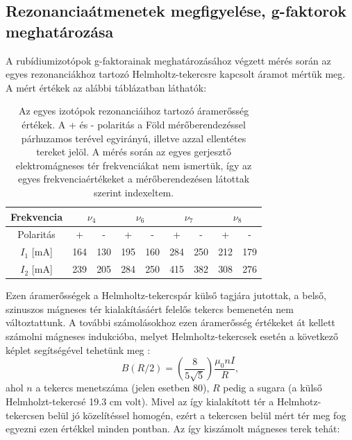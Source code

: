 \documentclass[12pt,a4paper]{article}
\begin{document}
\subsection{Rezonanciaátmenetek megfigyelése, g-faktorok meghatározása}
\hspace*{10pt} A rubídiumizotópok g-faktorainak meghatározásához végzett mérés során az egyes rezonanciákhoz tartozó Helmholtz-tekercsre kapcsolt áramot mértük meg. A mért értékek az alábbi táblázatban láthatók:
\begin{table}[!h]
\begin{center}
\begin{tabular}{|c||c|c||c|c||c|c||c|c|}
\hline
Frekvencia & \multicolumn{2}{|c||}{$\nu_4$} & \multicolumn{2}{|c||}{$\nu_6$} & \multicolumn{2}{|c||}{$\nu_7$} & \multicolumn{2}{|c|}{$\nu_8$}\\
\hline
Polaritás & + & - & + & - & + & - & + & - \\
\hline
$I_{1}$ [mA] & 164 & 130 & 195 & 160 & 284 & 250 & 212 & 179 \\
\hline
$I_{2}$ [mA] & 239 & 205 & 284 & 250 & 415 & 382 & 308 & 276 \\
\hline
\end{tabular}
\caption{Az egyes izotópok rezonanciáihoz tartozó áramerősség értékek. A + és - polaritás a Föld mérőberendezéssel párhuzamos terével egyirányú, illetve azzal ellentétes tereket jelöl. A mérés során az egyes gerjesztő elektromágneses tér frekvenciákat nem ismertük, így az egyes frekvenciaértékeket a mérőberendezésen látottak szerint indexeltem.}
\end{center}
\end{table}
\newline
Ezen áramerősségek a Helmholtz-tekercspár külső tagjára jutottak, a belső, szinuszos mágneses tér kialakításáért felelős tekercs bemenetén nem változtattunk. A további számolásokhoz ezen áramerősség értékeket át kellett számolni mágneses indukcióba, melyet Helmholtz-tekercsek esetén a következő képlet segítségével tehetünk meg \cite{2}:
\begin{equation}
B(R/2)=\left (\frac{8}{5\sqrt{5}} \right ) \frac{\mu_0 n I}{R},
\end{equation}
ahol $n$ a tekercs menetszáma (jelen esetben 80), $R$ pedig a sugara (a külső Helmholzt-tekercsé 19.3 cm volt). Mivel az így kialakított tér a Helmhotz-tekercsen belül jó közelítéssel homogén, ezért a tekercsen belül mért tér meg fog egyezni ezen értékkel minden pontban. Az így kiszámolt mágneses terek tehát:
\end{document}
